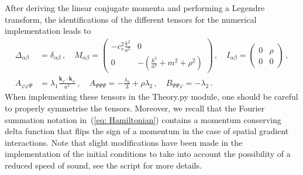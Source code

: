 \documentclass[11pt]{article}
\numberwithin{equation}{section} %
\begin{document}
\vskip 4pt
After deriving the linear conjugate momenta and performing a Legendre transform, the identifications of the different tensors for the numerical implementation leads to
\begin{equation}
\begin{aligned}
    \Delta_{\alpha\beta} &= \delta_{\alpha\beta}\,, \quad M_{\alpha\beta} = 
    \begin{pmatrix}
    -c_s^2 \tfrac{k^2}{a^2} & 0 \\
    0 & -\left(\tfrac{k^2}{a^2} + m^2 + \rho^2\right)
    \end{pmatrix}
    \,, 
    \quad I_{\alpha\beta} = 
    \begin{pmatrix}
    0 & \rho \\
    0 & 0
    \end{pmatrix}\,,\\ A_{\varphi\varphi\Psi} &= \lambda_1 \frac{\bm{k}_\varphi \cdot \bm{k}_\varphi}{a^2}\,, \quad A_{\Psi\Psi\Psi} = -\frac{\lambda_3}{3} + \rho\lambda_2\,, \quad B_{\Psi\Psi\varphi} = -\lambda_2\,.
\end{aligned}
\end{equation}
When implementing these tensors in the \textsf{Theory.py} module, one should be careful to properly symmetrise the tensors. Moreover, we recall that the Fourier summation notation in~(\ref{eq: Hamiltonian}) contains a momentum conserving delta function that flips the sign of a momentum in the case of spatial gradient interactions. Note that slight modifications have been made in the implementation of the initial conditions to take into account the possibility of a reduced speed of sound, see the script \href{https://github.com/deniswerth/CosmoFlow/blob/main/CosmoFlow/PhiPsi/Solver.py}{\faGithub} for more details. 
\end{document}
